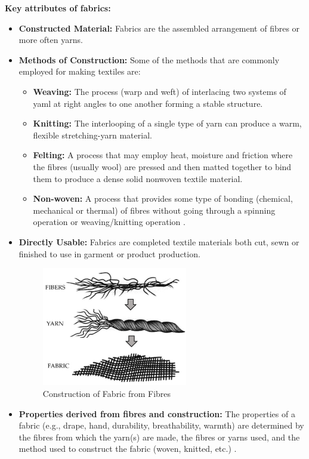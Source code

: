 \textbf{Key attributes of fabrics:}
\begin{itemize}
    \item \textbf{Constructed Material:} Fabrics are the assembled arrangement of fibres or more often yarns. 
    \item \textbf{Methods of Construction:} Some of the methods that are commonly employed for making textiles are: 
        \begin{itemize}
            \item \textbf{Weaving:} The process (warp and weft) of interlacing two systems of yaml at right angles to one another forming a stable structure.
            \item \textbf{Knitting:} The interlooping of a single type of yarn can produce a warm, flexible stretching-yarn material.
            \item \textbf{Felting:} A process that may employ heat, moisture and friction where the fibres (usually wool) are pressed and then matted together to bind them to produce a dense solid nonwoven textile material.
            \item \textbf{Non-woven:} A process that provides some type of bonding (chemical, mechanical or thermal) of fibres without going through a spinning operation or weaving/knitting operation \cite{hong2024research}.
        \end{itemize}
        \item \textbf{Directly Usable:} Fabrics are completed textile materials both cut, sewn or finished to use in garment or product production.
        \begin{figure}[H]
            \centering
            \includegraphics[width=0.6\textwidth]{images/fabric_construction}
            \caption{Construction of Fabric from Fibres}
            \label{fig:fabric_construction}
        \end{figure}
    \item \textbf{Properties derived from fibres and construction:} The properties of a fabric (e.g., drape, hand, durability, breathability, warmth) are determined by the fibres from which the yarn(s) are made, the fibres or yarns used, and the method used to construct the fabric (woven, knitted, etc.) \cite{researchgate, hong2024research}.
\end{itemize}

